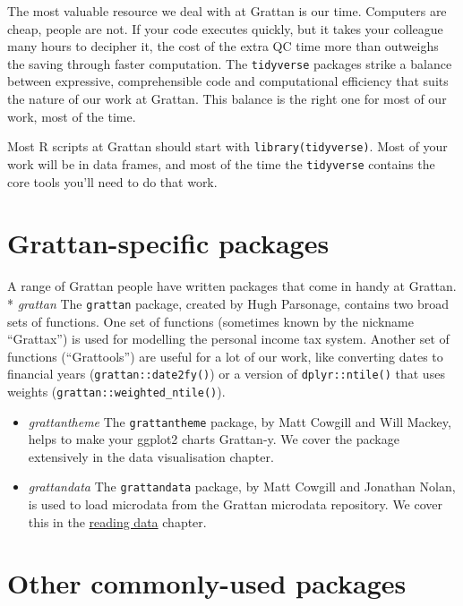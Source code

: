 \documentclass[
]{book}
\begin{document}
The most valuable resource we deal with at Grattan is our time. Computers are cheap, people are not. If your code executes quickly, but it takes your colleague many hours to decipher it, the cost of the extra QC time more than outweighs the saving through faster computation. The \texttt{tidyverse} packages strike a balance between expressive, comprehensible code and computational efficiency that suits the nature of our work at Grattan. This balance is the right one for most of our work, most of the time.

Most R scripts at Grattan should start with \texttt{library(tidyverse)}. Most of your work will be in data frames, and most of the time the \texttt{tidyverse} contains the core tools you'll need to do that work.

\hypertarget{grattan-specific-packages}{%
\section{Grattan-specific packages}\label{grattan-specific-packages}}

A range of Grattan people have written packages that come in handy at Grattan.
* \emph{grattan} The \texttt{grattan} package, created by Hugh Parsonage, contains two broad sets of functions. One set of functions (sometimes known by the nickname ``Grattax'') is used for modelling the personal income tax system. Another set of functions (``Grattools'') are useful for a lot of our work, like converting dates to financial years (\texttt{grattan::date2fy()}) or a version of \texttt{dplyr::ntile()} that uses weights (\texttt{grattan::weighted\_ntile()}).

\begin{itemize}
\item
  \emph{grattantheme} The \texttt{grattantheme} package, by Matt Cowgill and Will Mackey, helps to make your ggplot2 charts Grattan-y. We cover the package extensively in the data visualisation chapter.
\item
  \emph{grattandata} The \texttt{grattandata} package, by Matt Cowgill and Jonathan Nolan, is used to load microdata from the Grattan microdata repository. We cover this in the \protect\hyperlink{reading-data}{reading data} chapter.
\end{itemize}

\hypertarget{other-commonly-used-packages}{%
\section{Other commonly-used packages}\label{other-commonly-used-packages}}
\end{document}
